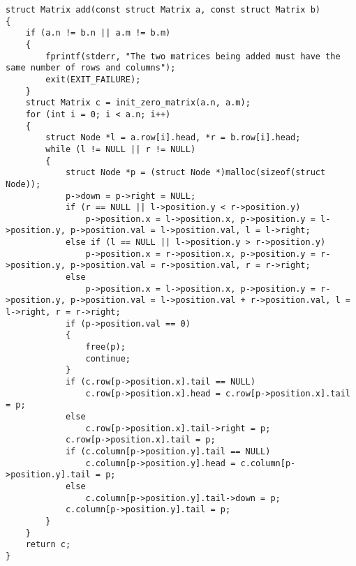 \documentclass[12pt]{article}
\begin{document}
{\begin{lstlisting}
struct Matrix add(const struct Matrix a, const struct Matrix b)
{
    if (a.n != b.n || a.m != b.m)
    {
        fprintf(stderr, "The two matrices being added must have the same number of rows and columns");
        exit(EXIT_FAILURE);
    }
    struct Matrix c = init_zero_matrix(a.n, a.m);
    for (int i = 0; i < a.n; i++)
    {
        struct Node *l = a.row[i].head, *r = b.row[i].head;
        while (l != NULL || r != NULL)
        {
            struct Node *p = (struct Node *)malloc(sizeof(struct Node));
            p->down = p->right = NULL;
            if (r == NULL || l->position.y < r->position.y)
                p->position.x = l->position.x, p->position.y = l->position.y, p->position.val = l->position.val, l = l->right;
            else if (l == NULL || l->position.y > r->position.y)
                p->position.x = r->position.x, p->position.y = r->position.y, p->position.val = r->position.val, r = r->right;
            else
                p->position.x = l->position.x, p->position.y = r->position.y, p->position.val = l->position.val + r->position.val, l = l->right, r = r->right;
            if (p->position.val == 0)
            {
                free(p);
                continue;
            }
            if (c.row[p->position.x].tail == NULL)
                c.row[p->position.x].head = c.row[p->position.x].tail = p;
            else
                c.row[p->position.x].tail->right = p;
            c.row[p->position.x].tail = p;
            if (c.column[p->position.y].tail == NULL)
                c.column[p->position.y].head = c.column[p->position.y].tail = p;
            else
                c.column[p->position.y].tail->down = p;
            c.column[p->position.y].tail = p;
        }
    }
    return c;
}


\end{lstlisting}}
\end{document}
